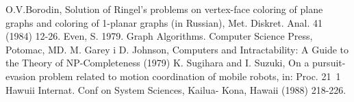 \documentclass[brudnopis]{xmgr}
\theoremstyle{definition}
\begin{document}
\begin{bibdiv}
\begin{biblist}
  O.V.Borodin, Solution of Ringel's problems on vertex-face coloring of plane graphs and coloring of 1-planar graphs (in Russian), Met. Diskret. Anal. 41 (1984) 12-26.
  Even, S. 1979. Graph Algorithms. Computer Science Press, Potomac, MD.
  M. Garey i D. Johnson, Computers and Intractability: A Guide to the Theory of NP-Completeness (1979)
  K. Sugihara  and I. Suzuki,  On a pursuit-evasion  problem related  to motion  coordination  of mobile robots,  in: Proc. 21~1 Hawuii  Internat.  Conf  on System  Sciences,  Kailua- Kona, Hawaii  (1988) 218-226.
\end{biblist}
\end{bibdiv}

\listoffigures

\oswiadczenie
\end{document}
